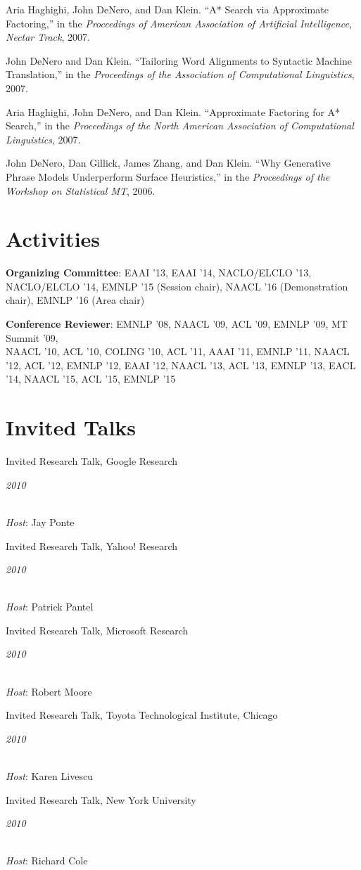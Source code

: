 \documentclass[margin,line]{res}
\newcommand{\dated}[2]{\parbox[t]{4.4in}{#1} \hspace{0.4in}
											 \parbox[t]{1in}{ {\it #2 } } }
\begin{document}
\begin{resume}
Aria Haghighi, John DeNero, and Dan Klein. ``A* Search via Approximate Factoring,'' in the {\it Proceedings of American Association of Artificial Intelligence, Nectar Track}, 2007.

John DeNero and Dan Klein. ``Tailoring Word Alignments to Syntactic Machine Translation,'' in the {\it Proceedings of the Association of Computational Linguistics}, 2007.

Aria Haghighi, John DeNero, and Dan Klein. ``Approximate Factoring for A* Search,'' in the {\it Proceedings of the North American Association of Computational Linguistics}, 2007.

John DeNero, Dan Gillick, James Zhang, and Dan Klein. ``Why Generative Phrase Models Underperform Surface Heuristics,'' in the {\it Proceedings of the Workshop on Statistical MT}, 2006.

\section{\sc Activities}

{\bf Organizing Committee}: EAAI '13, EAAI '14, NACLO/ELCLO '13, NACLO/ELCLO '14,
EMNLP '15 (Session chair), NAACL '16 (Demonstration chair), EMNLP '16 (Area chair)

{\bf Conference Reviewer}: EMNLP '08, NAACL '09, ACL '09, EMNLP '09, MT Summit
'09,\\ NAACL '10, ACL '10, COLING '10, ACL '11, AAAI '11, EMNLP '11, NAACL '12,
ACL '12, EMNLP '12, EAAI '12, NAACL '13, ACL '13, EMNLP '13, EACL '14,
NAACL '15, ACL '15, EMNLP '15

\section{\sc Invited Talks }

\dated{Invited Research Talk, Google Research}{2010} \\
{\em Host}: Jay Ponte

\dated{Invited Research Talk, Yahoo! Research}{2010} \\
{\em Host}: Patrick Pantel

\dated{Invited Research Talk, Microsoft Research}{2010} \\
{\em Host}: Robert Moore

\dated{Invited Research Talk, Toyota Technological Institute, Chicago}{2010} \\
{\em Host}: Karen Livescu

\dated{Invited Research Talk, New York University}{2010} \\
{\em Host}: Richard Cole


\end{resume}
\end{document}

